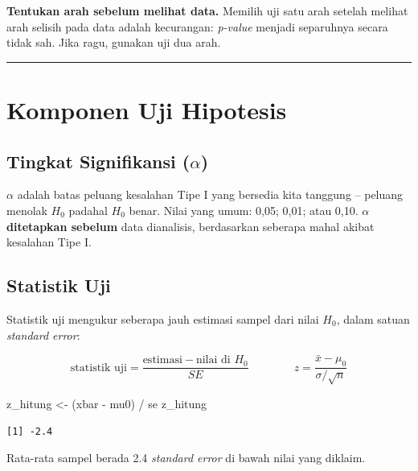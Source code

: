 \documentclass[
  indonesian,
  letterpaper,
]{book}
\newenvironment{Shaded}{\begin{snugshade}}{\end{snugshade}}
\newcommand{\NormalTok}[1]{\textcolor[rgb]{0.00,0.23,0.31}{#1}}
\newcommand{\OtherTok}[1]{\textcolor[rgb]{0.00,0.23,0.31}{#1}}
\newcommand{\SpecialCharTok}[1]{\textcolor[rgb]{0.37,0.37,0.37}{#1}}
\begin{document}
\textbf{Tentukan arah sebelum melihat data.} Memilih uji satu arah
setelah melihat arah selisih pada data adalah kecurangan: \emph{p-value}
menjadi separuhnya secara tidak sah. Jika ragu, gunakan uji dua arah.

\begin{center}\rule{0.5\linewidth}{0.5pt}\end{center}

\section{Komponen Uji Hipotesis}\label{komponen-uji-hipotesis}

\subsection{\texorpdfstring{Tingkat Signifikansi
(\(\alpha\))}{Tingkat Signifikansi (\textbackslash alpha)}}\label{tingkat-signifikansi-alpha}

\(\alpha\) adalah batas peluang kesalahan Tipe I yang bersedia kita
tanggung -- peluang menolak \(H_0\) padahal \(H_0\) benar. Nilai yang
umum: 0,05; 0,01; atau 0,10. \(\alpha\) \textbf{ditetapkan sebelum} data
dianalisis, berdasarkan seberapa mahal akibat kesalahan Tipe I.

\subsection{Statistik Uji}\label{statistik-uji}

Statistik uji mengukur seberapa jauh estimasi sampel dari nilai \(H_0\),
dalam satuan \emph{standard error}:

\[
\text{statistik uji} = \frac{\text{estimasi} - \text{nilai di } H_0}{SE}
\qquad\qquad
z = \frac{\bar{x} - \mu_0}{\sigma/\sqrt{n}}
\]

\begin{Shaded}
\begin{Highlighting}[]
\NormalTok{z\_hitung }\OtherTok{\textless{}{-}}\NormalTok{ (xbar }\SpecialCharTok{{-}}\NormalTok{ mu0) }\SpecialCharTok{/}\NormalTok{ se}
\NormalTok{z\_hitung}
\end{Highlighting}
\end{Shaded}

\begin{verbatim}
[1] -2.4
\end{verbatim}

Rata-rata sampel berada 2.4 \emph{standard error} di bawah nilai yang
diklaim.
\end{document}
